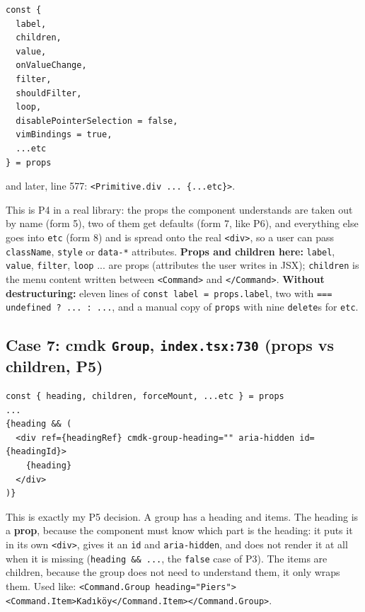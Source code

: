 \documentclass[
  10pt,
]{article}
\begin{document}
\begin{verbatim}
const {
  label,
  children,
  value,
  onValueChange,
  filter,
  shouldFilter,
  loop,
  disablePointerSelection = false,
  vimBindings = true,
  ...etc
} = props
\end{verbatim}

and later, line 577:
\texttt{<Primitive.\allowbreak{}div .\allowbreak{}.\allowbreak{}.\allowbreak{} \{.\allowbreak{}.\allowbreak{}.\allowbreak{}etc\}>}.

This is P4 in a real library: the props the component understands are
taken out by name (form 5), two of them get defaults (form 7, like P6),
and everything else goes into \texttt{etc} (form 8) and is spread onto
the real \texttt{<div>}, so a user can pass \texttt{className},
\texttt{style} or \texttt{data-*} attributes. \textbf{Props and children
here:} \texttt{label}, \texttt{value}, \texttt{filter}, \texttt{loop}
... are props (attributes the user writes in JSX); \texttt{children} is
the menu content written between \texttt{<Command>} and
\texttt{</\allowbreak{}Command>}. \textbf{Without destructuring:} eleven
lines of \texttt{const label =\allowbreak{} props.\allowbreak{}label},
two with
\texttt{=\allowbreak{}=\allowbreak{}=\allowbreak{} undefined ? .\allowbreak{}.\allowbreak{}.\allowbreak{} :\allowbreak{} .\allowbreak{}.\allowbreak{}.\allowbreak{}},
and a manual copy of \texttt{props} with nine \texttt{delete}s for
\texttt{etc}.

\hypertarget{case-7-cmdk-group-indextsx730-props-vs-children-p5}{%
\subsection{\texorpdfstring{Case 7: cmdk \texttt{Group},
\texttt{index.\allowbreak{}tsx:\allowbreak{}730} (props vs children,
P5)}{Case 7: cmdk ,  (props vs children, P5)}}\label{case-7-cmdk-group-indextsx730-props-vs-children-p5}}

\begin{verbatim}
const { heading, children, forceMount, ...etc } = props
...
{heading && (
  <div ref={headingRef} cmdk-group-heading="" aria-hidden id={headingId}>
    {heading}
  </div>
)}
\end{verbatim}

This is exactly my P5 decision. A group has a heading and items. The
heading is a \textbf{prop}, because the component must know which part
is the heading: it puts it in its own \texttt{<div>}, gives it an
\texttt{id} and \texttt{aria-hidden}, and does not render it at all when
it is missing
(\texttt{heading \&\& .\allowbreak{}.\allowbreak{}.\allowbreak{}}, the
\texttt{false} case of P3). The items are children, because the group
does not need to understand them, it only wraps them. Used like:
\texttt{<Command.\allowbreak{}Group heading=\allowbreak{}"Piers"><Command.\allowbreak{}Item>Kadıköy</\allowbreak{}Command.\allowbreak{}Item></\allowbreak{}Command.\allowbreak{}Group>}.
\end{document}
